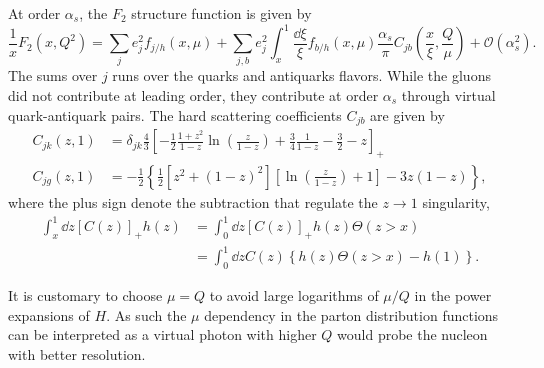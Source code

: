 \documentclass[../main.tex]{subfiles}
\begin{document}
At order $\alpha_s$, the $F_2$ structure function is given by~\cite{collins1989}
\begin{equation}
	\frac{1}{x} F_2\left(x,Q^2\right) = \sum_j e^2_j f_{j/h}\left(x,\mu\right) + \sum_{j,b} e^2_j \int^1_x \frac{\dd{\xi}}{\xi} f_{b/h}\left(x,\mu\right) \frac{\alpha_s}{\pi} C_{jb}\left(\frac{x}{\xi}, \frac{Q}{\mu}\right) + \mathcal{O}(\alpha_s^2).
\end{equation}
The sums over $j$ runs over the quarks and antiquarks flavors. While the gluons
did not contribute at leading order, they contribute at order $\alpha_s$ through
virtual quark-antiquark pairs. The hard scattering coefficients $C_{jb}$ are
given by
\begin{align}
	C_{jk}(z,1) & = \delta_{jk} \frac{4}{3} \left[ -\frac{1}{2}\frac{1+z^2}{1-z} \ln\left(\frac{z}{1-z}\right) + \frac{3}{4} \frac{1}{1-z} -\frac{3}{2} -z\right]_+ \\
	C_{jg}(z,1) & = -\frac{1}{2} \left\{ \frac{1}{2}\left[z^2+(1-z)^2\right] \left[\ln\left(\frac{z}{1-z}\right)+1\right] -3z(1-z)\right\},
\end{align}
where the plus sign denote the subtraction that regulate the $z\rightarrow1$
singularity,
\begin{equation}
	\begin{split}
		\int^1_x \dd{z} \left[C(z)\right]_+ h(z) &= \int_0^1 \dd{z} \left[C(z)\right]_+ h(z)\Theta(z>x)\\
		& = \int_0^1 \dd{z} C(z) \left\{h(z)\Theta(z>x) -h(1)\right\}.
	\end{split}
\end{equation}

It is customary to choose $\mu =Q$ to avoid large logarithms of $\mu /Q$ in the
power expansions of $H$. As such the $\mu$ dependency in the parton distribution
functions can be interpreted as a virtual photon with higher $Q$ would probe the
nucleon with better resolution.
\end{document}
